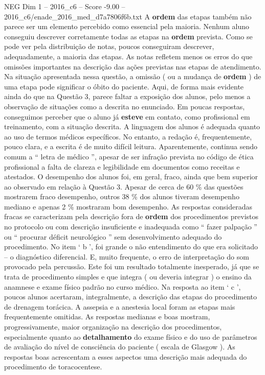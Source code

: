 \begin{textsample}{NEG Dim 1 – 2016\_c6 – Score -9.00 – 2016\_c6/enade\_2016\_med\_d7a7806f6b.txt}
A \textbf{ordem} das etapas também não parece ser um elemento percebido como essencial pela maioria.
Nenhum aluno conseguiu descrever corretamente todas as etapas na \textbf{ordem} prevista.
Como se pode ver pela distribuição de notas, poucos conseguiram descrever, adequadamente, a maioria das etapas.
As notas refletem menos os erros do que omissões importantes na descrição das ações previstas nas etapas de atendimento.
Na situação apresentada nessa questão, a omissão ( ou a mudança de \textbf{ordem} ) de uma etapa pode significar o óbito do paciente.
Aqui, de forma mais evidente ainda do que na Questão 3, parece faltar a exposição dos alunos, pelo menos a observação de situações como a descrita no enunciado.
Em poucas respostas, conseguimos perceber que o aluno já \textbf{esteve} em contato, como profissional em treinamento, com a situação descrita.
A linguagem dos alunos é adequada quanto ao uso de termos médicos específicos.
No entanto, a redação é, frequentemente, pouco clara, e a escrita é de muito difícil leitura.
Aparentemente, continua sendo comum a “ letra de médico ”, apesar de ser infração prevista no código de ética profissional a falta de clareza e legibilidade em documentos como receitas e atestados.
O desempenho dos alunos foi, em geral, fraco, ainda que bem superior ao observado em relação à Questão 3.
Apesar de cerca de 60 \% das questões mostrarem fraco desempenho, outros 38 \% dos alunos tiveram desempenho mediano e apenas 2 \% mostraram bom desempenho.
As respostas consideradas fracas se caracterizam pela descrição fora de \textbf{ordem} dos procedimentos previstos no protocolo ou com descrição insuficiente e inadequada como “ fazer palpação ” ou “ procurar déficit neurológico ” sem desenvolvimento adequado do procedimento.
No item ‘ b ’, foi grande o não entendimento do que era solicitado – o diagnóstico diferencial.
E, muito frequente, o erro de interpretação do som provocado pela percussão.
Este foi um resultado totalmente inesperado, já que se trata de procedimento simples e que integra ( ou deveria integrar ) o ensino da anamnese e exame físico padrão no curso médico.
Na resposta ao item ‘ c ’, poucos alunos acertaram, integralmente, a descrição das etapas do procedimento de drenagem torácica.
A assepsia e a anestesia local foram as etapas mais frequentemente omitidas.
As respostas medianas e boas mostram, progressivamente, maior organização na descrição dos procedimentos, especialmente quanto ao \textbf{detalhamento} do exame físico e do uso de parâmetros de avaliação do nível de consciência do paciente ( escala de Glasgow ).
As respostas boas acrescentam a esses aspectos uma descrição mais adequada do procedimento de toracocentese.

\end{textsample}
